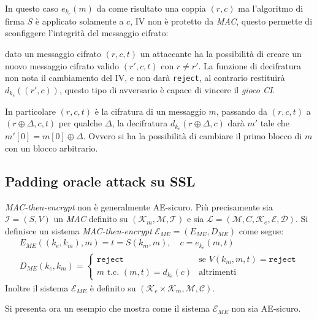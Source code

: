 In questo caso $e_{k_e}(m)$ da come risultato una coppia $(r,c)$ ma l'algoritmo di firma $S$ è applicato solamente a $c$, IV non è protetto da \emph{MAC}, questo permette di sconfiggere l'integrità del messaggio cifrato:

dato un messaggio cifrato $(r,c,t)$ un attaccante ha la possibilità di creare un nuovo messaggio cifrato valido $(r',c,t)$ con $r \neq r'$. La funzione di decifratura non nota il cambiamento del IV, e non darà \texttt{reject}, al contrario restituirà $d_{k_e}((r',c))$, questo tipo di avversario è capace di vincere il \emph{gioco CI}.

\vspace{1em}
In particolare $(r,c,t)$ è la cifratura di un messaggio $m$, passando da $(r,c,t)$ a $(r \oplus \Delta,c,t)$ per qualche $\Delta$, la decifratura $d_{k_e}(r \oplus \Delta, c)$ darà $m'$ tale che $m'[0] = m[0] \oplus \Delta$. Ovvero si ha la possibilità di cambiare il primo blocco di $m$ con un blocco arbitrario.

\subsection{Padding oracle attack su SSL}
\begin{definition}    
    \emph{MAC-then-encrypt} non è generalmente AE-sicuro. Più precisamente sia $\mathcal{I} = (S,V)$ un \emph{MAC} definito su $(\mathcal{K}_m,\mathcal{M},\mathcal{T})$ e sia $\mathcal{L} = (\mathcal{M},C,\mathcal{K}_e,\mathcal{E},\mathcal{D})$. Si definisce un sistema \emph{MAC-then-encrypt} $\mathcal{E}_{ME} = (E_{ME},D_{ME})$ come segue: 
    \begin{gather*}
    E_{ME}((k_e,k_m),m) = t = S(k_m,m), \quad c = e_{k_e}(m,t)\\
    D_{ME}(k_e,k_m) = 
    \begin{cases}
        \texttt{reject} & \text{se $V(k_m,m,t) = \texttt{reject}$}\\
        m \text{ t.c. } (m,t) = d_{k_e}(c) & \text{altrimenti}
    \end{cases}
\end{gather*}
Inoltre il sistema $\mathcal{E}_{ME}$ è definito su $(\mathcal{K}_e \times \mathcal{K}_m, \mathcal{M},\mathcal{C})$. 

\end{definition}

\vspace{1em}\noindent
Si presenta ora un esempio che mostra come il sistema $\mathcal{E}_{ME}$ non sia AE-sicuro. 

